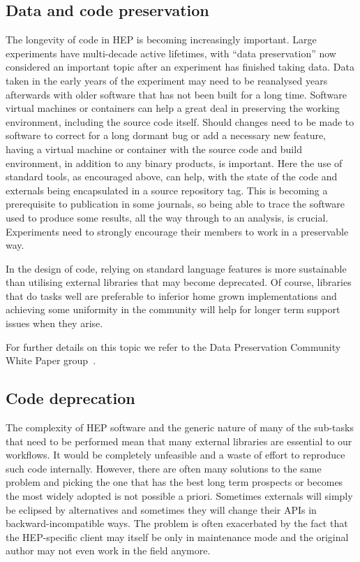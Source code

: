 \documentclass[12pt,a4paper]{article}
\begin{document}
\hypertarget{data-and-code-preservation}{%
\subsection{Data and code
preservation}\label{data-and-code-preservation}}

The longevity of code in HEP is becoming increasingly important. Large
experiments have multi-decade active lifetimes, with ``data
preservation'' now considered an important topic after an experiment has
finished taking data. Data taken in the early years of the experiment
may need to be reanalysed years afterwards with older software that has
not been built for a long time. Software virtual machines or containers
can help a great deal in preserving the working environment, including
the source code itself. Should changes need to be made to software to
correct for a long dormant bug or add a necessary new feature, having a
virtual machine or container with the source code and build environment,
in addition to any binary products, is important. Here the use of
standard tools, as encouraged above, can help, with the state of the
code and externals being encapsulated in a source repository tag. This
is becoming a prerequisite to publication in some journals, so being
able to trace the software used to produce some results, all the way
through to an analysis, is crucial. Experiments need to strongly
encourage their members to work in a preservable way.

In the design of code, relying on standard language features is more
sustainable than utilising external libraries that may become
deprecated. Of course, libraries that do tasks well are preferable to
inferior home grown implementations and achieving some uniformity in the
community will help for longer term support issues when they arise.

For further details on this topic we refer to the Data Preservation Community
White Paper group~\cite{HSF-CWP-2017-06}.

\hypertarget{code-deprecation}{%
\subsection{Code deprecation}\label{code-deprecation}}

The complexity of HEP software and the generic nature of many of the
sub-tasks that need to be performed mean that many external libraries
are essential to our workflows. It would be completely unfeasible and a
waste of effort to reproduce such code internally. However, there are
often many solutions to the same problem and picking the one that has
the best long term prospects or becomes the most widely adopted is not
possible a priori. Sometimes externals will simply be eclipsed by
alternatives and sometimes they will change their APIs in
backward-incompatible ways. The problem is often exacerbated by the fact
that the HEP-specific client may itself be only in maintenance mode and
the original author may not even work in the field anymore.~
\end{document}
